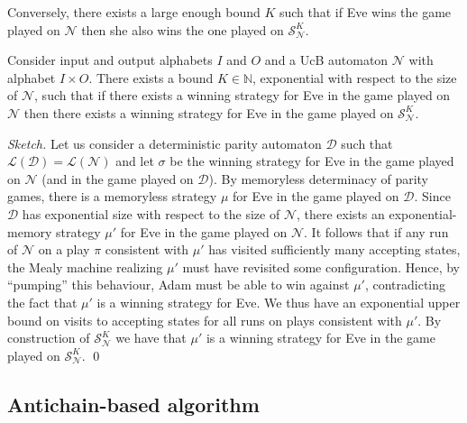 \documentclass[runningheads,a4paper,draft]{llncs}
\newcommand{\eve}{Eve\xspace}
\newcommand{\adam}{Adam\xspace}
\newcommand{\calN}{\mathcal{N}}
\newcommand{\calS}{\mathcal{S}}
\newcommand{\calD}{\mathcal{D}}
\newcommand{\lang}[1]{\mathcal{L}({#1})}
\begin{document}
Conversely, there exists a large enough bound $K$ such that if \eve wins the game
played on $\calN$ then she also wins the one played on $\calS^K_\calN$.
%
\begin{lemma}
    Consider input and output alphabets $I$ and $O$ and a UcB automaton
    $\calN$ with alphabet $I \times O$. There exists a bound $K \in
    \mathbb{N}$, exponential with respect to the size of $\calN$, such that if
    there exists a winning strategy for \eve in the game played on $\calN$
    then there exists a winning strategy for \eve in the game played on
    $\calS^K_\calN$.
\end{lemma}
\begin{proof}[Sketch]
    Let us consider a deterministic parity automaton $\calD$ such that
    $\lang{\calD} = \lang{\calN}$ and let $\sigma$ be the winning strategy for
    \eve in the game played on $\calN$ (and in the game played on $\calD$). By
    memoryless determinacy of parity games, there is a memoryless strategy $\mu$
    for \eve in the game played on $\calD$. Since $\calD$ has exponential size
    with respect to the size of $\calN$, there exists an exponential-memory
    strategy $\mu'$ for \eve in the game played on $\calN$. It follows that if
    any run of $\calN$ on a play $\pi$ consistent with $\mu'$ has visited
    sufficiently many accepting states, the Mealy machine realizing $\mu'$ must
    have revisited some configuration. Hence, by ``pumping'' this behaviour,
    \adam must be able to win against $\mu'$, contradicting the fact that $\mu'$
    is a winning strategy for \eve. We thus have an exponential upper bound on
    visits to accepting states for all runs on plays consistent with $\mu'$. By
    construction of $\calS^K_\calN$ we have that $\mu'$ is a winning strategy for
    \eve in the game played on $\calS^K_\calN$.
\qed\end{proof}

\subsection{Antichain-based algorithm}



{ }
\end{document}
